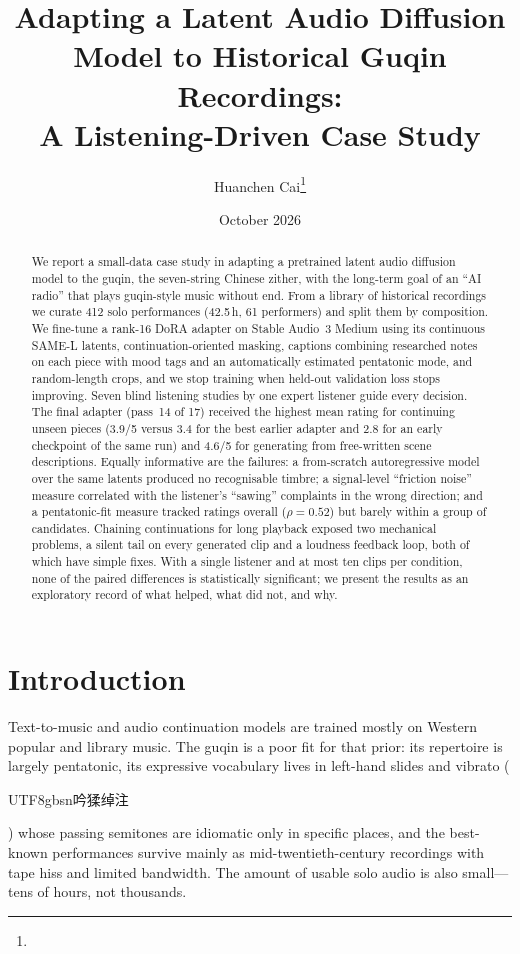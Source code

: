 \documentclass[11pt]{article}
\title{Adapting a Latent Audio Diffusion Model to Historical Guqin Recordings:\\
A Listening-Driven Case Study}
\author{Huanchen Cai\thanks{\todo{affiliation and contact e-mail}}}
\date{October 2026}
\newcommand{\zh}[1]{\begin{CJK}{UTF8}{gbsn}#1\end{CJK}}
\begin{document}
\maketitle

\begin{abstract}
We report a small-data case study in adapting a pretrained latent audio diffusion model to the guqin, the
seven-string Chinese zither, with the long-term goal of an ``AI radio'' that plays guqin-style music without end.
From a library of historical recordings we curate 412 solo performances (42.5\,h, 61 performers) and split them
by composition. We fine-tune a rank-16 DoRA adapter on Stable Audio~3 Medium using its continuous SAME-L latents,
continuation-oriented masking, captions combining researched notes on each piece with mood tags and an
automatically estimated pentatonic mode, and random-length crops, and we stop training when held-out
validation loss stops improving. Seven blind listening studies by one expert listener guide every decision.
The final adapter (pass~14 of 17) received the highest mean rating for continuing unseen pieces (3.9/5 versus
3.4 for the best earlier adapter and 2.8 for an early checkpoint of the same run) and 4.6/5 for generating from
free-written scene descriptions. Equally informative are the failures: a from-scratch autoregressive model over
the same latents produced no recognisable timbre; a signal-level ``friction noise'' measure correlated with the
listener's ``sawing'' complaints in the wrong direction; and a pentatonic-fit measure tracked ratings overall
($\rho=0.52$) but barely within a group of candidates. Chaining continuations for long playback exposed two
mechanical problems, a silent tail on every generated clip and a loudness feedback loop, both of which have simple
fixes. With a single listener and at most ten clips per condition, none of the paired differences is
statistically significant; we present the results as an exploratory record of what helped, what did not, and why.
\end{abstract}

\section{Introduction}

Text-to-music and audio continuation models are trained mostly on Western popular and library music.
The guqin is a poor fit for that prior: its repertoire is largely pentatonic, its expressive vocabulary
lives in left-hand slides and vibrato (\zh{吟猱绰注}) whose passing semitones are idiomatic only in specific places,
and the best-known performances survive mainly as mid-twentieth-century recordings with tape hiss and
limited bandwidth. The amount of usable solo audio is also small---tens of hours, not thousands.
\end{document}

